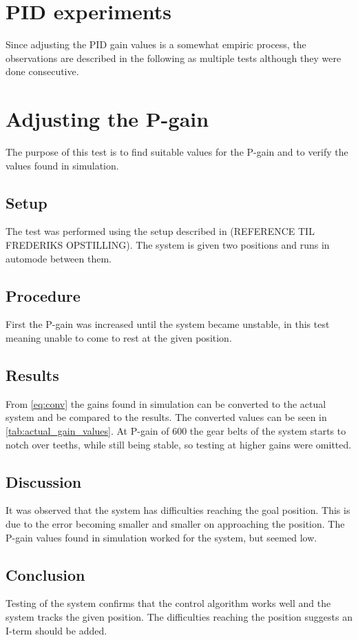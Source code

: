 \section{PID experiments}\label{sec:pid_experiments}
Since adjusting the PID gain values is a somewhat empiric process, the observations are described in the following as multiple tests although they were done consecutive.

\section{Adjusting the P-gain}\label{sec:pid_experiments_p}
The purpose of this test is to find suitable values for the P-gain and to verify the values found in simulation.

\subsection{Setup}
The test was performed using the setup described in (REFERENCE TIL FREDERIKS OPSTILLING). The system is given two positions and runs in automode between them.

\subsection{Procedure}
First the P-gain was increased until the system became unstable, in this test meaning unable to come to rest at the given position.

\subsection{Results}
From \ref{eq:conv} the gains found in simulation can be converted to the actual system and be compared to the results. The converted values can be seen in \ref{tab:actual_gain_values}. At P-gain of 600 the gear belts of the system starts to notch over teeths, while still being stable, so testing at higher gains were omitted.

\subsection{Discussion}
It was observed that the system has difficulties reaching the goal position. This is due to the error becoming smaller and smaller on approaching the position. The P-gain values found in simulation worked for the system, but seemed low.

\subsection{Conclusion}
Testing of the system confirms that the control algorithm works well and the system tracks the given position. The difficulties reaching the position suggests an I-term should be added.

